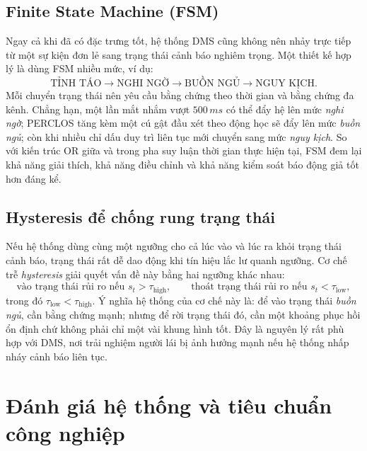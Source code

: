 \documentclass[12pt,a4paper]{article}
\begin{document}
\subsection{Finite State Machine (FSM)}
Ngay cả khi đã có đặc trưng tốt, hệ thống DMS cũng không nên nhảy trực tiếp từ một sự kiện đơn lẻ sang trạng thái cảnh báo nghiêm trọng. Một thiết kế hợp lý là dùng FSM nhiều mức, ví dụ:
\[
\text{TỈNH TÁO} \rightarrow \text{NGHI NGỜ} \rightarrow \text{BUỒN NGỦ} \rightarrow \text{NGUY KỊCH}.
\]
Mỗi chuyển trạng thái nên yêu cầu bằng chứng theo thời gian và bằng chứng đa kênh. Chẳng hạn, một lần mắt nhắm vượt \(500\,ms\) có thể đẩy hệ lên mức \textit{nghi ngờ}; PERCLOS tăng kèm một cú gật đầu xét theo động học sẽ đẩy lên mức \textit{buồn ngủ}; còn khi nhiều chỉ dấu duy trì liên tục mới chuyển sang mức \textit{nguy kịch}. So với kiến trúc OR giữa  và  trong pha suy luận thời gian thực hiện tại, FSM đem lại khả năng giải thích, khả năng điều chỉnh và khả năng kiểm soát báo động giả tốt hơn đáng kể.

\subsection{Hysteresis để chống rung trạng thái}
Nếu hệ thống dùng cùng một ngưỡng cho cả lúc vào và lúc ra khỏi trạng thái cảnh báo, trạng thái rất dễ dao động khi tín hiệu lắc lư quanh ngưỡng. Cơ chế trễ \textit{hysteresis} giải quyết vấn đề này bằng hai ngưỡng khác nhau:
\[
\text{vào trạng thái rủi ro nếu } s_t > \tau_{\text{high}}, \qquad
\text{thoát trạng thái rủi ro nếu } s_t < \tau_{\text{low}},
\]
trong đó \(\tau_{\text{low}} < \tau_{\text{high}}\). Ý nghĩa hệ thống của cơ chế này là: để vào trạng thái \textit{buồn ngủ}, cần bằng chứng mạnh; nhưng để rời trạng thái đó, cần một khoảng phục hồi ổn định chứ không phải chỉ một vài khung hình tốt. Đây là nguyên lý rất phù hợp với DMS, nơi trải nghiệm người lái bị ảnh hưởng mạnh nếu hệ thống nhấp nháy cảnh báo liên tục.

\section{Đánh giá hệ thống và tiêu chuẩn công nghiệp}
\end{document}
